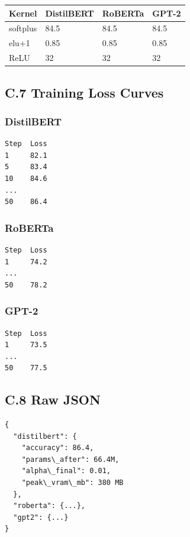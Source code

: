 \begin{table}[H]
\centering
\small
\begin{tabular}{llll}
\toprule
\textbf{Kernel} & \textbf{DistilBERT} & \textbf{RoBERTa} & \textbf{GPT-2} \\
\midrule
softplus & 84.5 & 84.5 & 84.5 \\
elu+1 & 0.85 & 0.85 & 0.85 \\
ReLU & 32 & 32 & 32 \\
\bottomrule
\end{tabular}
\end{table}

\subsection{C.7 Training Loss Curves}

\subsubsection{DistilBERT}

\begin{lstlisting}
Step  Loss
1     82.1
5     83.4
10    84.6
...
50    86.4
\end{lstlisting}

\subsubsection{RoBERTa}

\begin{lstlisting}
Step  Loss
1     74.2
...
50    78.2
\end{lstlisting}

\subsubsection{GPT-2}

\begin{lstlisting}
Step  Loss
1     73.5
...
50    77.5
\end{lstlisting}

\subsection{C.8 Raw JSON}

\begin{lstlisting}
{
  "distilbert": {
    "accuracy": 86.4,
    "params\_after": 66.4M,
    "alpha\_final": 0.01,
    "peak\_vram\_mb": 380 MB
  },
  "roberta": {...},
  "gpt2": {...}
}
\end{lstlisting}

